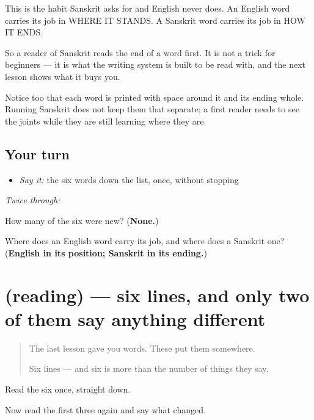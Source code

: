 This is the habit Sanskrit asks for and English never does. An English word carries its job in WHERE IT STANDS. A Sanskrit word carries its job in HOW IT ENDS.

So a reader of Sanskrit reads the end of a word first. It is not a trick for beginners — it is what the writing system is built to be read with, and the next lesson shows what it buys you.

Notice too that each word is printed with space around it and its ending whole. Running Sanskrit does not keep them that separate; a first reader needs to see the joints while they are still learning where they are.

\subsection*{Your turn}
\begin{itemize}
\raggedright
  \item \emph{Say it:} the six words down the list, once, without stopping
\end{itemize}

\emph{Twice through:}

\begin{tcolorbox}[breakable,colback=teal!4,colframe=teal!35!black,title={Before you move on}]
How many of the six were new? (\textbf{None.})

Where does an English word carry its job, and where does a Sanskrit one? (\textbf{English in its position; Sanskrit in its ending.})
\end{tcolorbox}
\section[(reading)]{(reading) — six lines, and only two of them say anything different}

\label{lesson:SA-C64-lines}



\begin{quote}
The last lesson gave you words. These put them somewhere.

Six lines — and six is more than the number of things they say.
\end{quote}

\begin{tcolorbox}[breakable,skin=enhanced,colback=orange!6,colframe=orange!45!black,boxrule=0.5pt,arc=1mm,left=6pt,right=6pt,top=4pt,bottom=4pt,fonttitle=\bfseries,title={Read this}]
\begin{quote}
                 
\end{quote}

Read the six once, straight down.

Now read the first three again and say what changed.
\end{tcolorbox}

